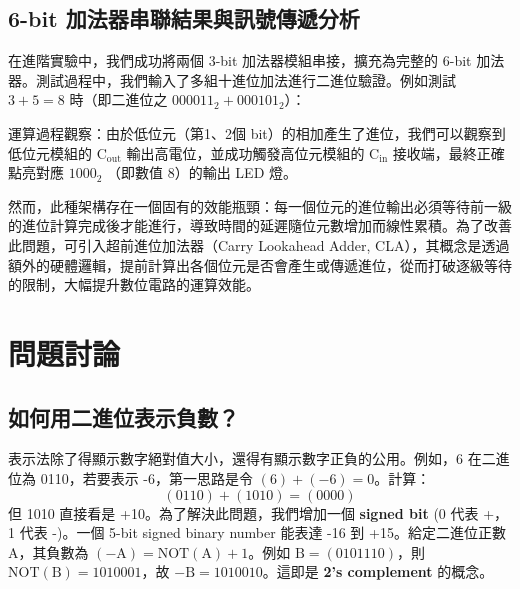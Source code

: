 \documentclass[12pt]{article}
\begin{document}
\subsection{6-bit 加法器串聯結果與訊號傳遞分析}
在進階實驗中，我們成功將兩個 3-bit 加法器模組串接，擴充為完整的 6-bit 加法器。測試過程中，我們輸入了多組十進位加法進行二進位驗證。例如測試 $3 + 5 = 8$ 時（即二進位之 $000011_2 + 000101_2$）：

運算過程觀察：由於低位元（第1、2個 bit）的相加產生了進位，我們可以觀察到低位元模組的 $\mathrm{C_{out}}$ 輸出高電位，並成功觸發高位元模組的 $\mathrm{C_{in}}$ 接收端，最終正確點亮對應 $1000_2$ （即數值 8）的輸出 LED 燈。


然而，此種架構存在一個固有的效能瓶頸：每一個位元的進位輸出必須等待前一級的進位計算完成後才能進行，導致時間的延遲隨位元數增加而線性累積。為了改善此問題，可引入超前進位加法器（Carry Lookahead Adder, CLA），其概念是透過額外的硬體邏輯，提前計算出各個位元是否會產生或傳遞進位，從而打破逐級等待的限制，大幅提升數位電路的運算效能。

\section{問題討論}

\subsection{如何用二進位表示負數？}
表示法除了得顯示數字絕對值大小，還得有顯示數字正負的公用。例如，6 在二進位為 0110，若要表示 -6，第一思路是令 $\mathrm{(6)+(-6)=0}$。計算：
\[ \mathrm{(0110)+(1010)=(0000)} \]
但 1010 直接看是 +10。為了解決此問題，我們增加一個 \textbf{signed bit} (0 代表 +，1 代表 -)。一個 5-bit signed binary number 能表達 -16 到 +15。給定二進位正數 $\mathrm{A}$，其負數為 $\mathrm{(-A) = \text{NOT}(A) + 1}$。例如 $\mathrm{B = (0101110)}$，則 $\text{NOT}(\mathrm{B}) = \mathrm{1010001}$，故 $\mathrm{-B = 1010010}$。這即是 \textbf{2’s complement} 的概念。
\end{document}
